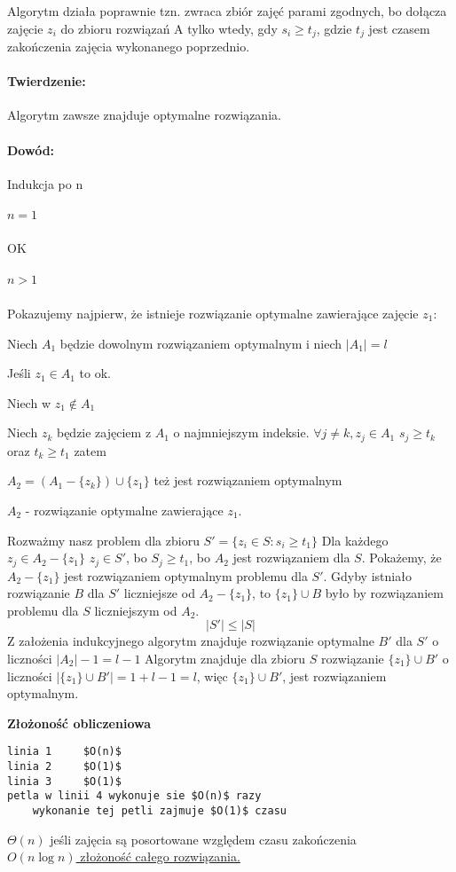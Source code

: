 Algorytm działa poprawnie tzn. zwraca zbiór zajęć parami zgodnych, bo dołącza zajęcie $z_i$ do zbioru rozwiązań A tylko wtedy, gdy $s_i \geq t_j$, gdzie $t_j$ jest czasem zakończenia zajęcia wykonanego poprzednio.

\paragraph{Twierdzenie:} {Algorytm zawsze znajduje optymalne rozwiązania.}
\paragraph{Dowód:} {Indukcja po n}

\subparagraph{$n = 1$ }
	OK
\subparagraph{$n > 1$ }{Pokazujemy najpierw, że istnieje rozwiązanie optymalne zawierające zajęcie $z_1$:

Niech $A_1$ będzie dowolnym rozwiązaniem optymalnym i niech $\vert A_1\vert = l$ 

Jeśli $z_1 \in A_1$ to ok.

Niech w $z_1 \not\in A_1$

Niech $z_k$ będzie zajęciem z $A_1$ o najmniejszym indeksie. $\forall{j} \neq k, z_j \in A_1$ $s_j \geq t_k$ oraz $t_k \geq t_1$ zatem

$A_2 = (A_1 - \lbrace z_k\rbrace ) \cup \lbrace z_1 \rbrace $ też jest rozwiązaniem optymalnym 

$A_2$ - rozwiązanie optymalne zawierające $z_1$.}
\newline

Rozważmy nasz problem dla zbioru $S' = \lbrace z_i \in S: s_i \geq t_1 \rbrace$ Dla każdego $z_j \in A_2 - \lbrace z_1 \rbrace$ $z_j \in S'$, bo $S_j \geq t_1$, bo $A_2$ jest rozwiązaniem dla $S$. Pokażemy, że $A_2 - \lbrace z_1 \rbrace$ jest rozwiązaniem optymalnym problemu dla $S'$. Gdyby istniało rozwiązanie $B$ dla $S'$ liczniejsze od $A_2 - \lbrace z_1 \rbrace$, to $\lbrace z_1 \rbrace \cup B$ było by rozwiązaniem problemu dla $S$ liczniejszym od $A_2$.
$$\vert S' \vert \leq \vert S \vert$$
Z założenia indukcyjnego algorytm znajduje rozwiązanie optymalne $B'$ dla $S'$ o liczności $\vert A_2 \vert - 1 = l - 1$
Algorytm znajduje dla zbioru $S$ rozwiązanie $\lbrace z_1 \rbrace \cup B'$ o liczności $\vert \lbrace z_1 \rbrace \cup B' \vert = 1 + l - 1 = l$, więc $\lbrace z_1 \rbrace \cup B'$, jest rozwiązaniem optymalnym.

 
\textbf{Złożoność obliczeniowa}
\begin{lstlisting}
linia 1		$O(n)$
linia 2 	$O(1)$
linia 3 	$O(1)$
petla w linii 4 wykonuje sie $O(n)$ razy
	wykonanie tej petli zajmuje $O(1)$ czasu
\end{lstlisting}

$\Theta(n)$ jeśli zajęcia są posortowane względem czasu zakończenia \\
\underline{$O(n \log n )$ złożoność całego rozwiązania.}


